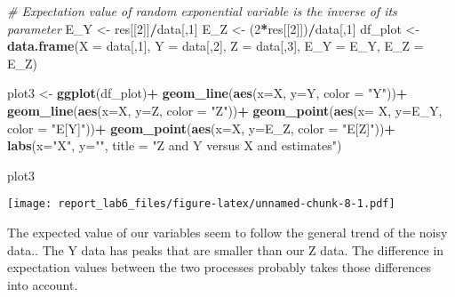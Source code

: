 \documentclass[
]{article}
\newenvironment{Shaded}{\begin{snugshade}}{\end{snugshade}}
\newcommand{\CommentTok}[1]{\textcolor[rgb]{0.56,0.35,0.01}{\textit{#1}}}
\newcommand{\DataTypeTok}[1]{\textcolor[rgb]{0.13,0.29,0.53}{#1}}
\newcommand{\DecValTok}[1]{\textcolor[rgb]{0.00,0.00,0.81}{#1}}
\newcommand{\KeywordTok}[1]{\textcolor[rgb]{0.13,0.29,0.53}{\textbf{#1}}}
\newcommand{\NormalTok}[1]{#1}
\newcommand{\OperatorTok}[1]{\textcolor[rgb]{0.81,0.36,0.00}{\textbf{#1}}}
\newcommand{\StringTok}[1]{\textcolor[rgb]{0.31,0.60,0.02}{#1}}
\begin{document}
\begin{Shaded}
\begin{Highlighting}[]
\CommentTok{# Expectation value of random exponential variable is the inverse of its parameter}
\NormalTok{E_Y <-}\StringTok{ }\NormalTok{res[[}\DecValTok{2}\NormalTok{]]}\OperatorTok{/}\NormalTok{data[,}\DecValTok{1}\NormalTok{]}
\NormalTok{E_Z <-}\StringTok{ }\NormalTok{(}\DecValTok{2}\OperatorTok{*}\NormalTok{res[[}\DecValTok{2}\NormalTok{]])}\OperatorTok{/}\NormalTok{data[,}\DecValTok{1}\NormalTok{]}
\NormalTok{df_plot <-}\StringTok{ }\KeywordTok{data.frame}\NormalTok{(}\DataTypeTok{X =}\NormalTok{ data[,}\DecValTok{1}\NormalTok{], }\DataTypeTok{Y =}\NormalTok{ data[,}\DecValTok{2}\NormalTok{], }\DataTypeTok{Z =}\NormalTok{ data[,}\DecValTok{3}\NormalTok{], }\DataTypeTok{E_Y =}\NormalTok{ E_Y, }\DataTypeTok{E_Z =}\NormalTok{ E_Z)}


\NormalTok{plot3 <-}\StringTok{ }\KeywordTok{ggplot}\NormalTok{(df_plot)}\OperatorTok{+}
\StringTok{  }\KeywordTok{geom_line}\NormalTok{(}\KeywordTok{aes}\NormalTok{(}\DataTypeTok{x=}\NormalTok{X, }\DataTypeTok{y=}\NormalTok{Y, }\DataTypeTok{color =} \StringTok{"Y"}\NormalTok{))}\OperatorTok{+}
\StringTok{  }\KeywordTok{geom_line}\NormalTok{(}\KeywordTok{aes}\NormalTok{(}\DataTypeTok{x=}\NormalTok{X, }\DataTypeTok{y=}\NormalTok{Z, }\DataTypeTok{color =} \StringTok{"Z"}\NormalTok{))}\OperatorTok{+}
\StringTok{  }\KeywordTok{geom_point}\NormalTok{(}\KeywordTok{aes}\NormalTok{(}\DataTypeTok{x=}\NormalTok{ X, }\DataTypeTok{y=}\NormalTok{E_Y, }\DataTypeTok{color =} \StringTok{"E[Y]"}\NormalTok{))}\OperatorTok{+}
\StringTok{  }\KeywordTok{geom_point}\NormalTok{(}\KeywordTok{aes}\NormalTok{(}\DataTypeTok{x=}\NormalTok{X, }\DataTypeTok{y=}\NormalTok{E_Z, }\DataTypeTok{color =} \StringTok{"E[Z]"}\NormalTok{))}\OperatorTok{+}
\StringTok{  }\KeywordTok{labs}\NormalTok{(}\DataTypeTok{x=}\StringTok{"X"}\NormalTok{, }\DataTypeTok{y=}\StringTok{""}\NormalTok{, }\DataTypeTok{title =} \StringTok{"Z and Y versus X and estimates"}\NormalTok{)}

\NormalTok{plot3}
\end{Highlighting}
\end{Shaded}

\texttt{[image: report\_lab6\_files/figure-latex/unnamed-chunk-8-1.pdf]}

The expected value of our variables seem to follow the general trend of
the noisy data.. The Y data has peaks that are smaller than our Z data.
The difference in expectation values between the two processes probably
takes those differences into account.
\end{document}
